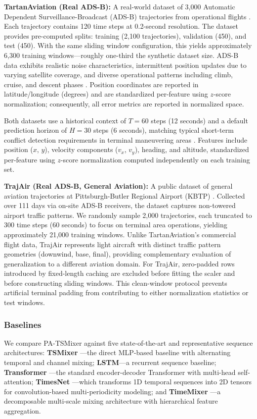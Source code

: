 \documentclass[letterpaper,journal]{IEEEtran}
\begin{document}
\textbf{TartanAviation (Real ADS-B):} A real-world dataset of 3,000 Automatic
Dependent Surveillance-Broadcast (ADS-B) trajectories from operational flights
\cite{Arteaga2024}. Each trajectory contains 120 time steps at 0.2-second resolution.
The dataset provides pre-computed splits: training (2,100 trajectories), validation
(450), and test (450). With the same sliding window configuration, this yields
approximately 6,300 training windows---roughly one-third the synthetic dataset size.
ADS-B data exhibits realistic noise characteristics, intermittent position updates
due to varying satellite coverage, and diverse operational patterns including climb,
cruise, and descent phases \cite{Sun2020}. Position coordinates are reported in
latitude/longitude (degrees) and are standardized per-feature using $z$-score
normalization; consequently, all error metrics are reported in normalized space.

Both datasets use a historical context of $T=60$ steps (12 seconds) and a default
prediction horizon of $H=30$ steps (6 seconds), matching typical short-term conflict
detection requirements in terminal maneuvering areas \cite{Schuster2024}.
Features include position ($x$, $y$), velocity components ($v_x$, $v_y$), heading,
and altitude, standardized per-feature using $z$-score normalization computed
independently on each training set.

\textbf{TrajAir (Real ADS-B, General Aviation):} A public dataset of general aviation
trajectories at Pittsburgh-Butler Regional Airport (KBTP) \cite{Patrikar2022TrajAir}.
Collected over 111 days via on-site ADS-B receivers, the dataset captures non-towered
airport traffic patterns. We randomly sample 2,000 trajectories, each truncated to 300
time steps (60 seconds) to focus on terminal area operations, yielding approximately
21,000 training windows. Unlike TartanAviation's commercial flight data, TrajAir
represents light aircraft with distinct traffic pattern geometries (downwind, base,
final), providing complementary evaluation of generalization to a different aviation domain.
For TrajAir, zero-padded rows introduced by fixed-length caching are excluded before
fitting the scaler and before constructing sliding windows. This clean-window protocol
prevents artificial terminal padding from contributing to either normalization
statistics or test windows.

\subsubsection{Baselines}
We compare PA-TSMixer against five state-of-the-art and representative sequence
architectures: \textbf{TSMixer} \cite{Chen2023TSMixer}---the direct MLP-based
baseline with alternating temporal and channel mixing; \textbf{LSTM}---a recurrent
sequence baseline; \textbf{Transformer}
\cite{Vaswani2017}---the standard encoder-decoder Transformer with multi-head
self-attention; \textbf{TimesNet} \cite{Wu2023TimesNet}---which transforms 1D
temporal sequences into 2D tensors for convolution-based multi-periodicity
modeling; and \textbf{TimeMixer} \cite{Wang2024TimeMixer}---a decomposable
multi-scale mixing architecture with hierarchical feature aggregation.
\end{document}
